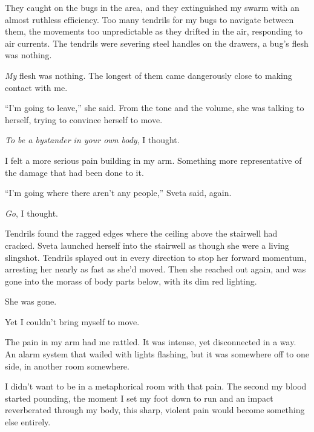 They caught on the bugs in the area, and they extinguished my swarm with an almost ruthless efficiency.  Too many tendrils for my bugs to navigate between them, the movements too unpredictable as they drifted in the air, responding to air currents.  The tendrils were severing steel handles on the drawers, a bug's flesh was nothing.



\emph{My} flesh was nothing.  The longest of them came dangerously close to making contact with me.



``I'm going to leave,'' she said.  From the tone and the volume, she was talking to herself, trying to convince herself to move.



\emph{To be a bystander in your own body}, I thought.



I felt a more serious pain building in my arm.  Something more representative of the damage that had been done to it.



``I'm going where there aren't any people,'' Sveta said, again.



\emph{Go}, I thought.



Tendrils found the ragged edges where the ceiling above the stairwell had cracked.  Sveta launched herself into the stairwell as though she were a living slingshot.  Tendrils splayed out in every direction to stop her forward momentum, arresting her nearly as fast as she'd moved.  Then she reached out again, and was gone into the morass of body parts below, with its dim red lighting.



She was gone.



Yet I couldn't bring myself to move.



The pain in my arm had me rattled.  It was intense, yet disconnected in a way.  An alarm system that wailed with lights flashing, but it was somewhere off to one side, in another room somewhere.



I didn't want to be in a metaphorical room with that pain.  The second my blood started pounding, the moment I set my foot down to run and an impact reverberated through my body, this sharp, violent pain would become something else entirely.



